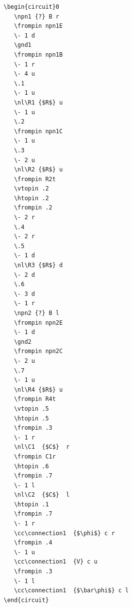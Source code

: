 \documentclass[a4paper,11pt]{amsart}
\theoremstyle{remark}
\begin{document}
\begin{verbatim}
   \begin{circuit}0
      \npn1 {?} B r
      \frompin npn1E
      \- 1 d
      \gnd1
      \frompin npn1B
      \- 1 r
      \- 4 u
      \.1
      \- 1 u
      \nl\R1 {$R$} u
      \- 1 u
      \.2
      \frompin npn1C
      \- 1 u
      \.3
      \- 2 u
      \nl\R2 {$R$} u
      \frompin R2t
      \vtopin .2
      \htopin .2
      \frompin .2
      \- 2 r
      \.4
      \- 2 r
      \.5
      \- 1 d
      \nl\R3 {$R$} d
      \- 2 d
      \.6
      \- 3 d
      \- 1 r
      \npn2 {?} B l
      \frompin npn2E
      \- 1 d
      \gnd2
      \frompin npn2C
      \- 2 u
      \.7
      \- 1 u
      \nl\R4 {$R$} u
      \frompin R4t
      \vtopin .5
      \htopin .5
      \frompin .3
      \- 1 r
      \nl\C1  {$C$}  r
      \frompin C1r
      \htopin .6
      \frompin .7
      \- 1 l
      \nl\C2  {$C$}  l
      \htopin .1
      \frompin .7
      \- 1 r
      \cc\connection1  {$\phi$} c r
      \frompin .4
      \- 1 u
      \cc\connection1  {V} c u
      \frompin .3
      \- 1 l
      \cc\connection1  {$\bar\phi$} c l
   \end{circuit}
\end{verbatim}
\end{document}
